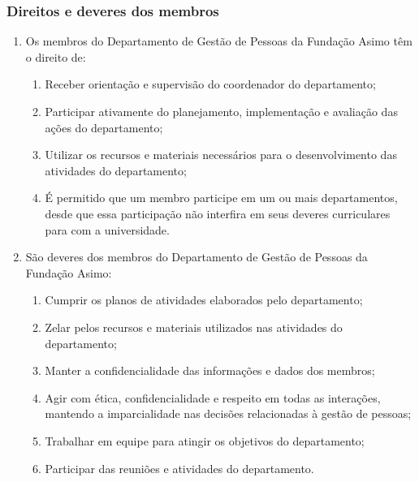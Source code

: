 {        \subsubsection{Direitos e deveres dos membros}   
        \begin{enumerate}
            \item Os membros do Departamento de Gestão de Pessoas da Fundação Asimo têm o direito de:
            \begin{enumerate}
                \item Receber orientação e supervisão do coordenador do departamento;
                \item Participar ativamente do planejamento, implementação e avaliação das ações do departamento;
                \item Utilizar os recursos e materiais necessários para o desenvolvimento das atividades do departamento;
                \item É permitido que um membro participe em um ou mais departamentos, desde que essa participação não interfira em seus deveres curriculares para com a universidade.
            \end{enumerate}
            \item São deveres dos membros do Departamento de Gestão de Pessoas da Fundação Asimo:
            \begin{enumerate}
                \item Cumprir os planos de atividades elaborados pelo departamento;
                \item Zelar pelos recursos e materiais utilizados nas atividades do departamento;
                \item Manter a confidencialidade das informações e dados dos membros;
                \item Agir com ética, confidencialidade e respeito em todas as interações, mantendo a imparcialidade nas decisões relacionadas à gestão de pessoas;
                \item Trabalhar em equipe para atingir os objetivos do departamento;
                \item Participar das reuniões e atividades do departamento.
            \end{enumerate}
        \end{enumerate}
}
